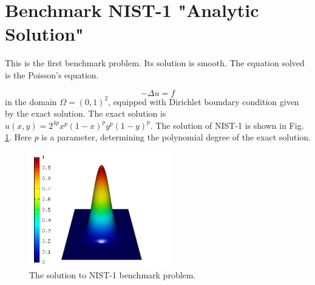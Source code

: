 \documentclass[12pt]{elsarticle}
\begin{document}

\section{Benchmark NIST-1 "Analytic Solution"}
\label{sec:bench-1}

This is the first benchmark problem. Its solution is smooth.
The equation solved is the Poisson's equation.

\begin{equation} \label{poisson}
-\Delta u = f
\end{equation}
in the domain $\Omega = (0, 1)^2$, equipped with Dirichlet
boundary condition given by the exact solution.
The exact solution is $u(x, y) = 2^{4p}x^{p}(1-x)^{p}y^{p}(1-y)^{p}$.
The solution of NIST-1 is shown in Fig. \ref{fig:sln-nist01}.
Here $p$ is a parameter, determining the polynomial degree of the exact solution.

\begin{figure}[H]
\centering
\vspace{-3mm}
\includegraphics[height=5cm]{nist/nist-1/solution.png}
\vspace{-3mm}
\caption{The solution to NIST-1 benchmark problem.}
\label{fig:sln-nist01}
\end{figure}

\end{document}
